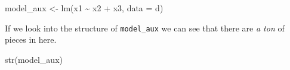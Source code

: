 \documentclass[
  letterpaper,
  DIV=11,
  numbers=noendperiod]{scrreprt}
\newenvironment{Shaded}{\begin{snugshade}}{\end{snugshade}}
\newcommand{\AttributeTok}[1]{\textcolor[rgb]{0.40,0.45,0.13}{#1}}
\newcommand{\FunctionTok}[1]{\textcolor[rgb]{0.28,0.35,0.67}{#1}}
\newcommand{\NormalTok}[1]{\textcolor[rgb]{0.00,0.23,0.31}{#1}}
\newcommand{\OtherTok}[1]{\textcolor[rgb]{0.00,0.23,0.31}{#1}}
\newcommand{\SpecialCharTok}[1]{\textcolor[rgb]{0.37,0.37,0.37}{#1}}
\begin{document}
\begin{Shaded}
\begin{Highlighting}[]
\NormalTok{model\_aux }\OtherTok{\textless{}{-}} \FunctionTok{lm}\NormalTok{(x1 }\SpecialCharTok{\textasciitilde{}}\NormalTok{ x2 }\SpecialCharTok{+}\NormalTok{ x3, }\AttributeTok{data =}\NormalTok{ d)}
\end{Highlighting}
\end{Shaded}

If we look into the structure of \texttt{model\_aux} we can see that
there are \emph{a ton} of pieces in here.

\begin{Shaded}
\begin{Highlighting}[]
\FunctionTok{str}\NormalTok{(model\_aux)}
\end{Highlighting}
\end{Shaded}
\end{document}
